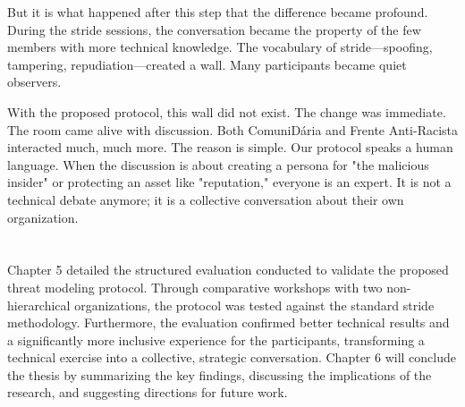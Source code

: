But it is what happened after this step that the difference became profound.
During the \gls{stride} sessions, the conversation became the property of the few
members with more technical knowledge. The vocabulary of \gls{stride}—spoofing,
tampering, repudiation—created a wall. Many participants became quiet observers.

With the proposed protocol, this wall did not exist. The change was immediate.
The room came alive with discussion. Both ComuniDária and Frente Anti-Racista
interacted much, much more. The reason is simple. Our protocol speaks a human
language. When the discussion is about creating a persona for "the malicious
insider" or protecting an asset like "reputation," everyone is an expert. It is
not a technical debate anymore; it is a collective conversation about their own
organization.

\section*{}
Chapter 5 detailed the structured evaluation conducted to validate the
proposed threat modeling protocol. Through comparative workshops with two
non-hierarchical organizations, the protocol was tested against the
standard \gls{stride} methodology. Furthermore, the evaluation confirmed
better technical results and a significantly more inclusive experience for the participants,
transforming a technical exercise into a collective, strategic conversation.
Chapter 6 will conclude the thesis by summarizing the key findings, discussing
the implications of the research, and suggesting directions for future work.